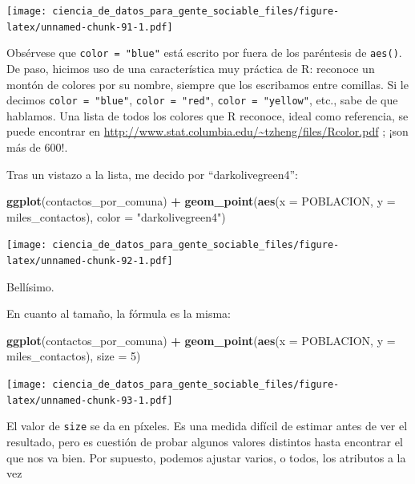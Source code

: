 \documentclass[spanish,]{book}
\newenvironment{Shaded}{\begin{snugshade}}{\end{snugshade}}
\newcommand{\DataTypeTok}[1]{\textcolor[rgb]{0.13,0.29,0.53}{#1}}
\newcommand{\DecValTok}[1]{\textcolor[rgb]{0.00,0.00,0.81}{#1}}
\newcommand{\KeywordTok}[1]{\textcolor[rgb]{0.13,0.29,0.53}{\textbf{#1}}}
\newcommand{\NormalTok}[1]{#1}
\newcommand{\OperatorTok}[1]{\textcolor[rgb]{0.81,0.36,0.00}{\textbf{#1}}}
\newcommand{\StringTok}[1]{\textcolor[rgb]{0.31,0.60,0.02}{#1}}
\begin{document}
\texttt{[image: ciencia\_de\_datos\_para\_gente\_sociable\_files/figure-latex/unnamed-chunk-91-1.pdf]}

Obsérvese que \texttt{color\ =\ "blue"} está escrito por fuera de los paréntesis de \texttt{aes()}. De paso, hicimos uso de una característica muy práctica de R: reconoce un montón de colores por su nombre, siempre que los escribamos entre comillas. Si le decimos \texttt{color\ =\ "blue"}, \texttt{color\ =\ "red"}, \texttt{color\ =\ "yellow"}, etc., sabe de que hablamos. Una lista de todos los colores que R reconoce, ideal como referencia, se puede encontrar en \url{http://www.stat.columbia.edu/~tzheng/files/Rcolor.pdf} ; ¡son más de 600!.

Tras un vistazo a la lista, me decido por ``darkolivegreen4'':

\begin{Shaded}
\begin{Highlighting}[]
\KeywordTok{ggplot}\NormalTok{(contactos_por_comuna) }\OperatorTok{+}\StringTok{ }
\StringTok{    }\KeywordTok{geom_point}\NormalTok{(}\KeywordTok{aes}\NormalTok{(}\DataTypeTok{x =}\NormalTok{ POBLACION, }\DataTypeTok{y =}\NormalTok{ miles_contactos), }\DataTypeTok{color =} \StringTok{"darkolivegreen4"}\NormalTok{)}
\end{Highlighting}
\end{Shaded}

\texttt{[image: ciencia\_de\_datos\_para\_gente\_sociable\_files/figure-latex/unnamed-chunk-92-1.pdf]}

Bellísimo.

En cuanto al tamaño, la fórmula es la misma:

\begin{Shaded}
\begin{Highlighting}[]
\KeywordTok{ggplot}\NormalTok{(contactos_por_comuna) }\OperatorTok{+}\StringTok{ }
\StringTok{    }\KeywordTok{geom_point}\NormalTok{(}\KeywordTok{aes}\NormalTok{(}\DataTypeTok{x =}\NormalTok{ POBLACION, }\DataTypeTok{y =}\NormalTok{ miles_contactos), }\DataTypeTok{size =} \DecValTok{5}\NormalTok{)}
\end{Highlighting}
\end{Shaded}

\texttt{[image: ciencia\_de\_datos\_para\_gente\_sociable\_files/figure-latex/unnamed-chunk-93-1.pdf]}

El valor de \texttt{size} se da en píxeles. Es una medida difícil de estimar antes de ver el resultado, pero es cuestión de probar algunos valores distintos hasta encontrar el que nos va bien. Por supuesto, podemos ajustar varios, o todos, los atributos a la vez
\end{document}
